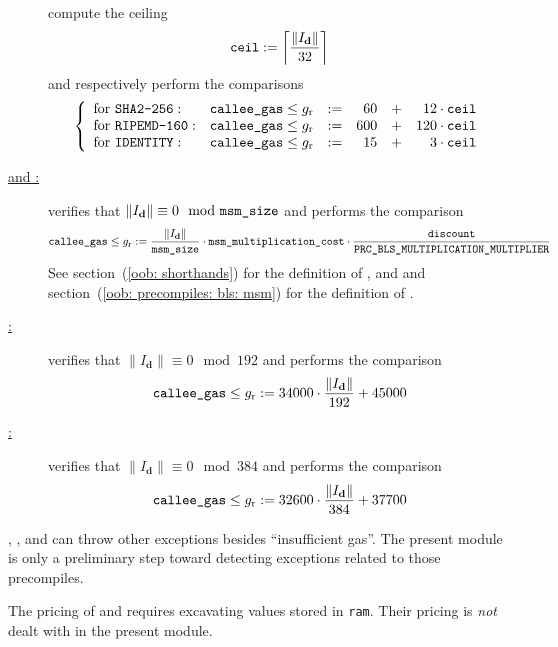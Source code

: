 \begin{description}
		compute the ceiling
		\[ \texttt{ceil} := \left \lceil \frac{\| I_\textbf{d} \|}{32} \right \rceil \]
		and respectively perform the comparisons
		\[
			\left\{ \begin{array}{llcrcr}
				\text{for }\texttt{SHA2-256}   : & \texttt{callee\_gas} \leq g_\text{r} & := & 60  & + & 12  \cdot \texttt{ceil}  \\
				\text{for }\texttt{RIPEMD-160} : & \texttt{callee\_gas} \leq g_\text{r} & := & 600 & + & 120 \cdot \texttt{ceil}  \\
				\text{for }\texttt{IDENTITY}   : & \texttt{callee\_gas} \leq g_\text{r} & := & 15  & + & 3   \cdot \texttt{ceil}  \\
			\end{array} \right.
		\]
	\item[\underline{\inst{BLS\_G1MSM} and \inst{BLS\_G2MSM}:}]
		verifies that $\| I_\textbf{d} \| \equiv 0 \mod {\texttt{msm\_size}}$ and performs the comparison 
		\[ \texttt{callee\_gas} \leq g_\text{r} := \frac{\| I_\textbf{d} \|}{\texttt{msm\_size}} \cdot \texttt{msm\_multiplication\_cost} \cdot \frac{\texttt{discount}}{\texttt{PRC\_BLS\_MULTIPLICATION\_MULTIPLIER}} \]
		See section~(\ref{oob: shorthands}) for the definition of \locMsmSize{}, \locMsmMultiplicationCost{} and \prcBlsMultiplicationMultiplier{} and section~(\ref{oob: precompiles: bls: msm}) for the definition of \locDiscount{}.
	\item[\underline{\inst{ECPAIRING}:}]
		verifies that $\| I_\textbf{d} \| \equiv 0 \mod 192$ and performs the comparison 
		\[ \texttt{callee\_gas} \leq g_\text{r} := 34000 \cdot \frac{\| I_\textbf{d} \|}{192} + 45000 \]
	\item[\underline{\inst{BLS\_PAIRING\_CHECK}:}]
		verifies that $\| I_\textbf{d} \| \equiv 0 \mod 384$ and performs the comparison 
		\[ \texttt{callee\_gas} \leq g_\text{r} := 32600 \cdot \frac{\| I_\textbf{d} \|}{384} + 37700 \]
\end{description}

\saNote{}
, ,  and  can throw other exceptions besides ``insufficient gas''.
The present module is only a preliminary step toward detecting exceptions related to those precompiles.

\saNote{} The pricing of  and  requires excavating values stored in \texttt{ram}. Their pricing is \emph{not} dealt with in the present module. 
